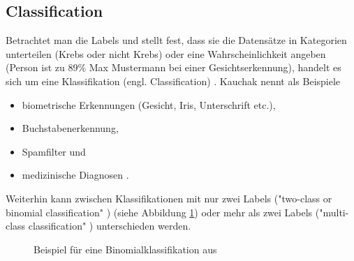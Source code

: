 \subsection{Classification} \label{subsubsec:classification}
Betrachtet man die Labels und stellt fest, dass sie die Datensätze in Kategorien unterteilen (Krebs oder nicht Krebs) oder eine Wahrscheinlichkeit angeben (Person ist zu 89\% Max Mustermann bei einer Gesichtserkennung), handelt es sich um eine Klassifikation (engl. Classification) \citep[S.~67]{swamynathan_mastering_2017}. Kauchak nennt als Beispiele
\begin{itemize}
\item biometrische Erkennungen (Gesicht, Iris, Unterschrift etc.),
\item Buchstabenerkennung,
\item Spamfilter und
\item medizinische Diagnosen \citep[S.~5]{kauchak_neural_2016}.
\end{itemize}
Weiterhin kann zwischen Klassifikationen mit nur zwei Labels ("two-class or binomial classification" \citep{ericson_how_2017}) (siehe Abbildung \ref{fig:classification}) oder mehr als zwei Labels ("multi-class classification" \citep{ericson_how_2017}) unterschieden werden.
\begin{figure}[H]
\centering
{}
\caption{Beispiel für eine Binomialklassifikation aus \citep[S.~8]{suthaharan_machine_2016}}
\label{fig:classification}
\end{figure}

